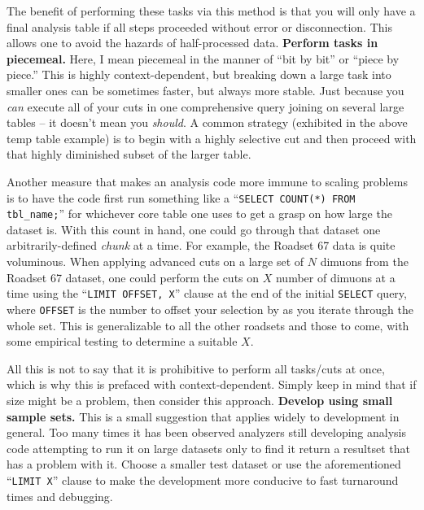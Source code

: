 The benefit of performing these tasks via this method is that you will only have a final analysis table if all steps proceeded without error or disconnection. This allows one to avoid the hazards of half-processed data.
\newline\newline
\textbf{Perform tasks in piecemeal.} Here, I mean piecemeal in the manner of ``bit by bit'' or ``piece by piece.'' This is highly context-dependent, but breaking down a large task into smaller ones can be sometimes faster, but always more stable. Just because you \emph{can} execute all of your cuts in one comprehensive query joining on several large tables -- it doesn't mean you \emph{should}. A common strategy (exhibited in the above temp table example) is to begin with a highly selective cut and then proceed with that highly diminished subset of the larger table.

Another measure that makes an analysis code more immune to scaling problems is to have the code first run something like a ``\lstinline|SELECT COUNT(*) FROM tbl_name;|'' for whichever core table one uses to get a grasp on how large the dataset is. With this count in hand, one could go through that dataset one arbitrarily-defined \emph{chunk} at a time. For example, the Roadset 67 data is quite voluminous. When applying advanced cuts on a large set of $N$ dimuons from the Roadset 67 dataset, one could perform the cuts on $X$ number of dimuons at a time using the ``\lstinline|LIMIT OFFSET, X|'' clause at the end of the initial \lstinline|SELECT| query, where \lstinline|OFFSET| is the number to offset your selection by as you iterate through the whole set. This is generalizable to all the other roadsets and those to come, with some empirical testing to determine a suitable $X$.

All this is not to say that it is prohibitive to perform all tasks/cuts at once, which is why this is prefaced with context-dependent. Simply keep in mind that if size might be a problem, then consider this approach.
\newline\newline
\textbf{Develop using small sample sets.} This is a small suggestion that applies widely to development in general. Too many times it has been observed analyzers still developing analysis code attempting to run it on large datasets only to find it return a resultset that has a problem with it. Choose a smaller test dataset or use the aforementioned ``\lstinline|LIMIT X|'' clause to make the development more conducive to fast turnaround times and debugging.

